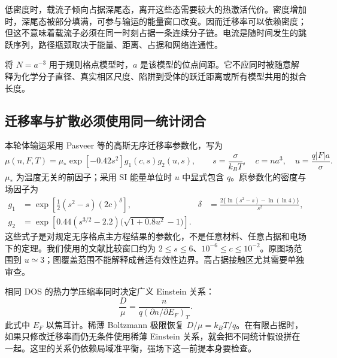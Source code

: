 {\cjkfont 低密度时，载流子倾向占据深尾态，离开这些态需要较大的热激活代价。密度增加时，深尾态被部分填满，可参与输运的能量窗口改变。因而迁移率可以依赖密度；但这不意味着载流子必须在同一时刻占据一条连续分子链。电流是随时间发生的跳跃序列，路径瓶颈取决于能量、距离、占据和网络连通性。}\allowbreak{}

{\cjkfont 将}\allowbreak{} $N=a^{-3}$ {\cjkfont 用于规则格点模型时，}\allowbreak{}$a$ {\cjkfont 是该模型的位点间距。它不应同时被随意解释为化学分子直径、真实相区尺度、陷阱到受体的跃迁距离或所有模型共用的拟合长度。}\allowbreak{}

\subsection{{\cjkfont 迁移率与扩散必须使用同一统计闭合}\allowbreak{}}
{\cjkfont 本轮体输运采用}\allowbreak{} Pasveer {\cjkfont 等的高斯无序迁移率参数化，写为}\allowbreak{}
\begin{equation}
 \mu(n,F,T)=\mu_*\exp[-0.42s^2]g_1(c,s)g_2(u,s),\qquad
 s=\frac{\sigma}{k_BT},\quad c=na^3,\quad u=\frac{q|F|a}{\sigma}.
\end{equation}
$\mu_*$ {\cjkfont 为温度无关的前因子；采用}\allowbreak{} SI {\cjkfont 能量单位时}\allowbreak{} $u$ {\cjkfont 中显式包含}\allowbreak{} $q${\cjkfont 。原参数化的密度与场因子为}\allowbreak{}
\begin{align}
 g_1&=\exp\!\left[\tfrac12(s^2-s)(2c)^\delta\right], &
 \delta&=\frac{2\{\ln(s^2-s)-\ln(\ln4)\}}{s^2},\\
 g_2&=\exp\!\left[0.44(s^{3/2}-2.2)\bigl(\sqrt{1+0.8u^2}-1\bigr)\right].
\end{align}
{\cjkfont 这些式子是对规定无序格点主方程结果的参数化，不是任意材料、任意占据和电场下的定理。我们使用的文献比较窗口约为}\allowbreak{} $2\le s\le6${\cjkfont 、}\allowbreak{}$10^{-6}\le c\le10^{-2}${\cjkfont 。原图场范围到}\allowbreak{} $u\simeq3${\cjkfont ；图覆盖范围不能解释成普适有效性边界。高占据接触区尤其需要单独审查。}\allowbreak{}

{\cjkfont 相同}\allowbreak{} DOS {\cjkfont 的热力学压缩率同时决定广义}\allowbreak{} Einstein {\cjkfont 关系：}\allowbreak{}
\begin{equation}
 \frac{D}{\mu}=\frac{n}{q(\partial n/\partial E_F)_T}.
\end{equation}
{\cjkfont 此式中}\allowbreak{} $E_F$ {\cjkfont 以焦耳计。稀薄}\allowbreak{} Boltzmann {\cjkfont 极限恢复}\allowbreak{} $D/\mu=k_BT/q${\cjkfont 。在有限占据时，如果只修改迁移率而仍无条件使用稀薄}\allowbreak{} Einstein {\cjkfont 关系，就会把不同统计假设拼在一起。这里的关系仍依赖局域准平衡，强场下这一前提本身要检查。}\allowbreak{}

